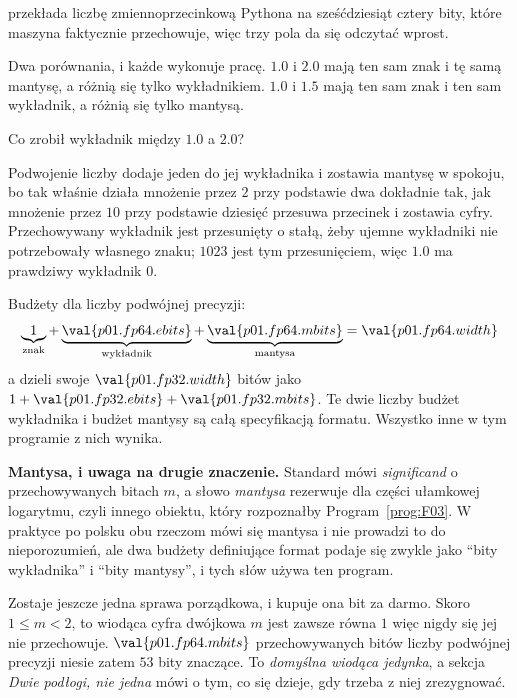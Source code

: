 \begin{fr}
 przekłada liczbę zmiennoprzecinkową Pythona na sześćdziesiąt
cztery bity, które maszyna faktycznie przechowuje, więc trzy pola da się
odczytać wprost.


Dwa porównania, i każde wykonuje pracę. $\num{1.0}$ i $\num{2.0}$ mają ten sam
znak i tę samą mantysę, a różnią się tylko wykładnikiem. $\num{1.0}$ i
$\num{1.5}$ mają ten sam znak i ten sam wykładnik, a różnią się tylko mantysą.

Co zrobił wykładnik między $\num{1.0}$ a $\num{2.0}$?
\nextframe
\end{fr}

\begin{fr}
Podwojenie liczby dodaje jeden do jej wykładnika i zostawia mantysę w spokoju,
bo tak właśnie działa mnożenie przez $2$ przy podstawie dwa \dash{} dokładnie
tak, jak mnożenie przez $10$ przy podstawie dziesięć przesuwa przecinek i
zostawia cyfry. Przechowywany wykładnik jest przesunięty o stałą, żeby ujemne
wykładniki nie potrzebowały własnego znaku; $1023$ jest tym przesunięciem,
więc $\num{1.0}$ ma prawdziwy wykładnik $0$.

Budżety dla liczby podwójnej precyzji:
\[ \underbrace{1}_{\text{znak}} + \underbrace{\val{p01.fp64.ebits}}_{\text{wykładnik}}
   + \underbrace{\val{p01.fp64.mbits}}_{\text{mantysa}}
   = \val{p01.fp64.width} \]
a  dzieli swoje $\val{p01.fp32.width}$ bitów jako
$1 + \val{p01.fp32.ebits} + \val{p01.fp32.mbits}$. Te dwie liczby \dash{}
budżet wykładnika i budżet mantysy \dash{} są całą specyfikacją formatu.
Wszystko inne w tym programie z nich wynika.
\end{fr}

\begin{fr}
\begin{notationbox}
\textbf{Mantysa, i uwaga na drugie znaczenie.} Standard mówi
\emph{significand} o przechowywanych bitach $m$, a słowo \emph{mantysa}
rezerwuje dla części ułamkowej logarytmu, czyli innego obiektu, który
rozpoznałby Program~\ref{prog:F03}. W praktyce po polsku obu rzeczom mówi się
mantysa i nie prowadzi to do nieporozumień, ale dwa budżety definiujące format
podaje się zwykle jako \enquote{bity wykładnika} i \enquote{bity mantysy}, i
tych słów używa ten program.
\end{notationbox}

Zostaje jeszcze jedna sprawa porządkowa, i kupuje ona bit za darmo. Skoro
$1 \le m < 2$, to wiodąca cyfra dwójkowa $m$ jest zawsze równa $1$ \dash{}
więc nigdy się jej nie przechowuje. $\val{p01.fp64.mbits}$ przechowywanych
bitów liczby podwójnej precyzji niesie zatem $53$ bity znaczące. To
\emph{domyślna wiodąca jedynka}, a sekcja \emph{Dwie podłogi, nie jedna} mówi o tym, co się dzieje, gdy
trzeba z niej zrezygnować.
\end{fr}

